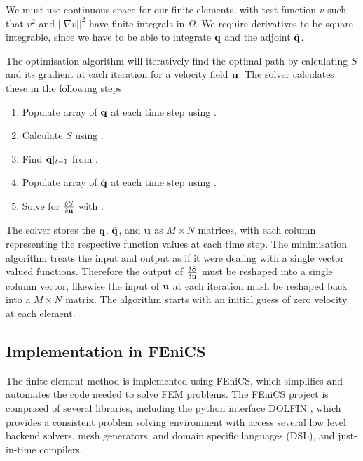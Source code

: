 \documentclass[a4paper, 12pt]{article}
\begin{document}
We must use continuous space for our finite elements, with test function $v$
such that $v^2$ and $||\nabla v||^2$ have finite integrals in $\Omega$. We
require derivatives to be square integrable, since we have to be able to
integrate $\mathbf{q}$ and the adjoint $\hat{\mathbf{q}}$.


The optimisation algorithm will iteratively find the optimal path by calculating
$S$ and its gradient at each iteration for a velocity field $\mathbf{u}$. The
solver calculates these in the following steps
\begin{enumerate}
\item Populate array of $\mathbf{q}$ at each time step using .
\item Calculate $S$ using .
\item Find $\hat{\mathbf{q}}|_{t=1}$ from .
\item Populate array of $\hat{\mathbf{q}}$ at each time step using .
\item Solve for $\frac{\delta S}{\delta \mathbf{u}}$ with .
\end{enumerate}

The solver stores the $\mathbf{q}$, $\hat{\mathbf{q}}$, and $\mathbf{u}$ as $M\times N$
matrices, with each column representing the respective function values at each
time step. The minimisation algorithm treats the input and output as if it were
dealing with a single vector valued functions. Therefore the output of
$\frac{\delta S}{\delta \mathbf{u}}$ must be reshaped into a single column vector, likewise the
input of $\mathbf{u}$ at each iteration mush be reshaped back into a $M\times N$
matrix. The algorithm starts with an initial guess of zero velocity at each
element.

\subsection{Implementation in FEniCS}
The finite element method is implemented using FEniCS, which simplifies and
automates the code needed to solve FEM problems. The FEniCS project is
comprised of several libraries, including the python interface DOLFIN
\cite{logg2010dolfin}, which provides a consistent problem solving environment
\cite{dolfin} with access several low level backend solvers, mesh generators,
and domain specific languages (DSL), and just-in-time compilers. 

\end{document}
